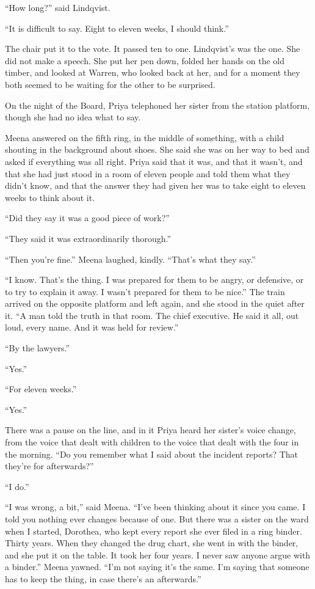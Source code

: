 ``How long?'' said Lindqvist.

``It is difficult to say. Eight to eleven weeks, I should think.''

The chair put it to the vote. It passed ten to one. Lindqvist's was the one. She did not make a speech. She put her pen down, folded her hands on the old timber, and looked at Warren, who looked back at her, and for a moment they both seemed to be waiting for the other to be surprised.

\scenebreak
\noindent On the night of the Board, Priya telephoned her sister from the station platform, though she had no idea what to say.

Meena answered on the fifth ring, in the middle of something, with a child shouting in the background about shoes. She said she was on her way to bed and asked if everything was all right. Priya said that it was, and that it wasn't, and that she had just stood in a room of eleven people and told them what they didn't know, and that the answer they had given her was to take eight to eleven weeks to think about it.

``Did they say it was a good piece of work?''

``They said it was extraordinarily thorough.''

``Then you're fine.'' Meena laughed, kindly. ``That's what they say.''

``I know. That's the thing. I was prepared for them to be angry, or defensive, or to try to explain it away. I wasn't prepared for them to be nice.'' The train arrived on the opposite platform and left again, and she stood in the quiet after it. ``A man told the truth in that room. The chief executive. He said it all, out loud, every name. And it was held for review.''

``By the lawyers.''

``Yes.''

``For eleven weeks.''

``Yes.''

There was a pause on the line, and in it Priya heard her sister's voice change, from the voice that dealt with children to the voice that dealt with the four in the morning. ``Do you remember what I said about the incident reports? That they're for afterwards?''

``I do.''

``I was wrong, a bit,'' said Meena. ``I've been thinking about it since you came. I told you nothing ever changes because of one. But there was a sister on the ward when I started, Dorothea, who kept every report she ever filed in a ring binder. Thirty years. When they changed the drug chart, she went in with the binder, and she put it on the table. It took her four years. I never saw anyone argue with a binder.'' Meena yawned. ``I'm not saying it's the same. I'm saying that someone has to keep the thing, in case there's an afterwards.''

